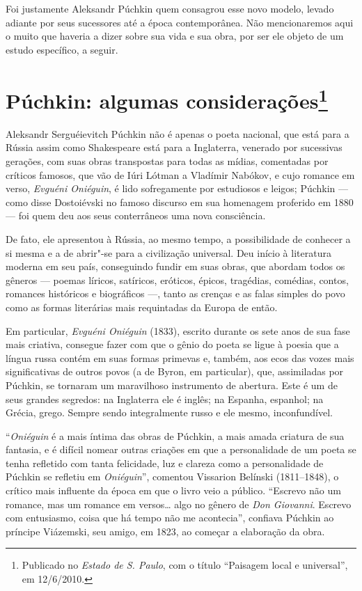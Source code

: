 Foi justamente Aleksandr Púchkin quem consagrou esse novo modelo, levado
adiante por seus sucessores até a época contemporânea. Não mencionaremos
aqui o muito que haveria a dizer sobre sua vida e sua obra, por ser ele
objeto de um estudo específico, a seguir.

\chapter{Púchkin: algumas considerações\footnote{Publicado no \emph{Estado de S. Paulo}, com o título ``Paisagem local e universal'', em 12/6/2010.}}

Aleksandr Serguéievitch Púchkin não é apenas o poeta nacional, que está
para a Rússia assim como Shakespeare está para a Inglaterra, venerado
por sucessivas gerações, com suas obras transpostas para todas as
mídias, comentadas por críticos famosos, que vão de Iúri Lótman a
Vladímir Nabókov, e cujo romance em verso, \emph{Evguéni Oniéguin}, é lido
sofregamente por estudiosos e leigos; Púchkin --- como disse
Dostoiévski no famoso discurso em sua homenagem proferido em 1880 --- foi quem deu aos seus conterrâneos uma nova consciência.

De fato, ele apresentou à Rússia, ao mesmo tempo, a possibilidade de
conhecer a si mesma e a de abrir"-se para a civilização universal.
Deu início à literatura moderna em seu país, conseguindo fundir em suas obras, que abordam todos os gêneros --- poemas
líricos, satíricos, eróticos, épicos, tragédias, comédias, contos,
romances históricos e biográficos ---, tanto as crenças e as falas simples
do povo como as formas literárias mais requintadas da Europa de então.

Em particular, \emph{Evguéni Oniéguin} (1833), escrito durante os
sete anos de sua fase mais criativa, consegue fazer com que o gênio do poeta se ligue à poesia
que a língua russa contém em suas formas primevas e, também, aos ecos das
vozes mais significativas de outros povos (a de Byron, em particular),
que, assimiladas por Púchkin, se tornaram um maravilhoso instrumento de
abertura. Este é um de seus grandes segredos: na Inglaterra ele é
inglês; na Espanha, espanhol; na Grécia, grego. Sempre sendo
integralmente russo e ele mesmo, inconfundível.

``\emph{Oniéguin} é a mais íntima das obras de Púchkin, a mais amada criatura de
sua fantasia, e é difícil nomear outras criações em que a personalidade
de um poeta se tenha refletido com tanta felicidade, luz e clareza como
a personalidade de Púchkin se refletiu em \emph{Oniéguin}'', comentou Vissarion
Belínski (1811--1848), o crítico mais influente da época em que o livro veio a
público. ``Escrevo não um romance, mas um romance em versos\ldots{} algo no
gênero de \emph{Don Giovanni}. Escrevo com entusiasmo, coisa que há tempo não
me acontecia'', confiava Púchkin ao príncipe Viázemski, seu amigo, em
1823, ao começar a elaboração da obra.

